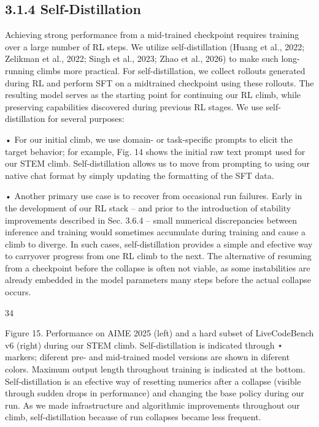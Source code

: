 \documentclass[
  10
]{article}
\begin{document}
\subsection{3.1.4 Self‐Distillation}\label{selfdistillation}

Achieving strong performance from a mid-trained checkpoint requires
training over a large number of RL steps. We utilize self-distillation
(Huang et al., 2022; Zelikman et al., 2022; Singh et al., 2023; Zhao et
al., 2026) to make such long-running climbs more practical. For
self-distillation, we collect rollouts generated during RL and perform
SFT on a midtrained checkpoint using these rollouts. The resulting model
serves as the starting point for continuing our RL climb, while
preserving capabilities discovered during previous RL stages. We use
self-distillation for several purposes:

• For our initial climb, we use domain- or task-specific prompts to
elicit the target behavior; for example, Fig. 14 shows the initial raw
text prompt used for our STEM climb. Self-distillation allows us to move
from prompting to using our native chat format by simply updating the
formatting of the SFT data.

• Another primary use case is to recover from occasional run failures.
Early in the development of our RL stack -- and prior to the
introduction of stability improvements described in Sec. 3.6.4 -- small
numerical discrepancies between inference and training would sometimes
accumulate during training and cause a climb to diverge. In such cases,
self-distillation provides a simple and efective way to carryover
progress from one RL climb to the next. The alternative of resuming from
a checkpoint before the collapse is often not viable, as some
instabilities are already embedded in the model parameters many steps
before the actual collapse occurs.

34

Figure 15. Performance on AIME 2025 (left) and a hard subset of
LiveCodeBench v6 (right) during our STEM climb. Self-distillation is
indicated through ⋆ markers; diferent pre- and mid-trained model
versions are shown in diferent colors. Maximum output length throughout
training is indicated at the bottom. Self-distillation is an efective
way of resetting numerics after a collapse (visible through sudden drops
in performance) and changing the base policy during our run. As we made
infrastructure and algorithmic improvements throughout our climb,
self-distillation because of run collapses became less frequent.
\end{document}
